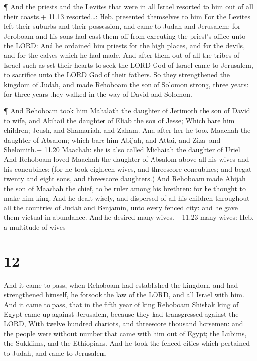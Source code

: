  ¶ And the priests and the Levites that were in all Israel
resorted to him out of all their coasts.+ 11.13 resorted\ldots: Heb.
presented themselves to him  For the Levites left their
suburbs and their possession, and came to Judah and Jerusalem: for
Jeroboam and his sons had cast them off from executing the priest's
office unto the LORD:  And he ordained him priests for the
high places, and for the devils, and for the calves which he had made.
 And after them out of all the tribes of Israel such as set
their hearts to seek the LORD God of Israel came to Jerusalem, to
sacrifice unto the LORD God of their fathers.  So they
strengthened the kingdom of Judah, and made Rehoboam the son of Solomon
strong, three years: for three years they walked in the way of David and
Solomon.

 ¶ And Rehoboam took him Mahalath the daughter of Jerimoth
the son of David to wife, and Abihail the daughter of Eliab the son of
Jesse;  Which bare him children; Jeush, and Shamariah, and
Zaham.  And after her he took Maachah the daughter of
Absalom; which bare him Abijah, and Attai, and Ziza, and Shelomith.+
11.20 Maachah: she is also called Michaiah the daughter of Uriel
 And Rehoboam loved Maachah the daughter of Absalom above
all his wives and his concubines: (for he took eighteen wives, and
threescore concubines; and begat twenty and eight sons, and threescore
daughters.)  And Rehoboam made Abijah the son of Maachah
the chief, to be ruler among his brethren: for he thought to make him
king.  And he dealt wisely, and dispersed of all his
children throughout all the countries of Judah and Benjamin, unto every
fenced city: and he gave them victual in abundance. And he desired many
wives.+ 11.23 many wives: Heb. a multitude of wives

\hypertarget{section-11}{%
\section{12}\label{section-11}}

 And it came to pass, when Rehoboam had established the
kingdom, and had strengthened himself, he forsook the law of the LORD,
and all Israel with him.  And it came to pass, that in the
fifth year of king Rehoboam Shishak king of Egypt came up against
Jerusalem, because they had transgressed against the LORD, 
With twelve hundred chariots, and threescore thousand horsemen: and the
people were without number that came with him out of Egypt; the Lubims,
the Sukkiims, and the Ethiopians.  And he took the fenced
cities which pertained to Judah, and came to Jerusalem.

